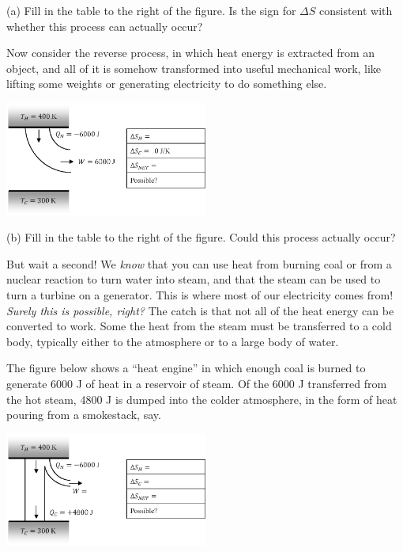 (a) Fill in the table to the right of the figure.  Is the sign for $\Delta S$ consistent with whether this process can actually occur?
\answerspace{0.6 in}

\pagebreak[3]
Now consider the reverse process, in which heat energy is extracted from an object, and all of it is somehow transformed into useful mechanical work, like lifting some weights or generating electricity to do something else.

\begin{center}
\vspace{-0.3 in}
\includegraphics[width=0.5\textwidth]{entropy_is_it_possible/fig4.eps}
\vspace{-0.3 in}
\end{center}

(b) Fill in the table to the right of the figure.  Could this process actually occur? 
\answerspace{0.2 in}

But wait a second!  We \textit{know} that you can use heat from burning coal or from a nuclear reaction to turn water into steam, and that the steam can be used to turn a turbine on a generator.  This is where most of our electricity comes from!  \textit{Surely this is possible, right?}  The catch is that not all of the heat energy can be converted to work.  Some the heat from the steam must be transferred to a cold body, typically either to the atmosphere or to a large body of water.  

The figure below shows a ``heat engine'' in which enough coal is burned to generate 6000 J of heat in a reservoir of steam.  Of the 6000 J transferred from the hot steam, 4800 J is dumped into the colder atmosphere, in the form of heat pouring from a smokestack, say.   

\begin{center}
\vspace{-0.3 in}
\includegraphics[width=0.5\textwidth]{entropy_is_it_possible/fig5.eps}
\vspace{-0.3 in}
\end{center}

